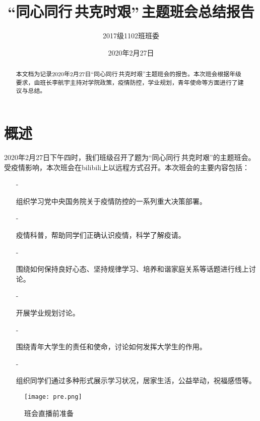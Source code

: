 \documentclass[UTF8]{ctexart}
\title{“同心同行\,共克时艰”\,主题班会总结报告}
\author{2017级1102班班委}
\date{}
\begin{document}
	
	\maketitle
	\begin{flushright}
		\date{2020年2月27日}
	\end{flushright}
	\title{\vspace{5em}}
	\begin{abstract}
	本文档为记录2020年2月27日“同心同行\,共克时艰”主题班会的报告。本次班会根据年级要求，由班长李航宇主持对学院政策，疫情防控，学业规划，青年使命等方面进行了建议与总结。
	\end{abstract}
	\thispagestyle{empty}%

	\newpage
	\setcounter{page}{1}
	\section*{概述}
	\title{\vspace{1em}}
	\par{2020年2月27日下午四时，我们班级召开了题为“同心同行\,共克时艰”的主题班会。受疫情影响，本次班会在bilibili上以远程方式召开。本次班会的主要内容包括：}
	\begin{itemize}
	    \item[-]\par{组织学习党中央国务院关于疫情防控的一系列重大决策部署。}
	    \item[-]\par{疫情科普，帮助同学们正确认识疫情，科学了解疫请。}
		\item[-]\par{围绕如何保持良好心态、坚持规律学习、培养和谐家庭关系等话题进行线上讨论。}
		\item[-]\par{开展学业规划讨论。}
		\item[-]\par{围绕青年大学生的责任和使命，讨论如何发挥大学生的作用。}
		\item[-]\par{组织同学们通过多种形式展示学习状况，居家生活，公益举动，祝福感悟等。}
	\end{itemize}
	\title{\vspace{1em}}
	\begin{figure}[H]
		\centering
		\begin{center}{}
			\begin{minipage}[t]{4.5in}
				\texttt{[image: pre.png]}
				\caption*{\kaishu 班会直播前准备}
			\end{minipage}
		\end{center}
	\end{figure}
\end{document}

